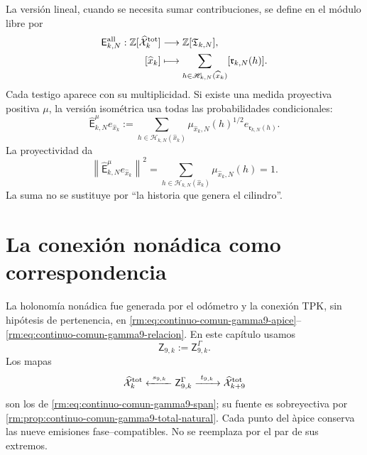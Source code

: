 La versi\'on lineal, cuando se necesita sumar contribuciones, se define en
el m\'odulo libre por
\begin{equation}
\label{rm:eq:pdfv2-terminal-evaluacion-todas}
 \begin{aligned}
 \mathsf E_{k,N}^{\rm all}:
 \mathbb Z[\widehat{\mathcal X}^{\rm tot}_k]&\longrightarrow
 \mathbb Z[\mathfrak T_{k,N}],\\
 [\widehat x_k]&\longmapsto
 \sum_{h\in\mathscr H_{k,N}(\widehat x_k)}
 [\mathfrak r_{k,N}(h)].
 \end{aligned}
\end{equation}
Cada testigo aparece con su multiplicidad. Si existe una medida proyectiva
positiva \(\mu\), la versi\'on isom\'etrica usa todas las probabilidades
condicionales:
\begin{equation}
\label{rm:eq:pdfv2-terminal-evaluacion-ponderada}
 \widehat{\mathsf E}_{k,N}^{\mu}e_{\widehat x_k}
 :=\sum_{h\in\mathscr H_{k,N}(\widehat x_k)}
 \mu_{\widehat x_k,N}(h)^{1/2}
 e_{\mathfrak r_{k,N}(h)}.
\end{equation}
La proyectividad da
\begin{equation}
\label{rm:eq:pdfv2-terminal-isometria}
 \left\|\widehat{\mathsf E}_{k,N}^{\mu}e_{\widehat x_k}\right\|^2
 =\sum_{h\in\mathscr H_{k,N}(\widehat x_k)}
   \mu_{\widehat x_k,N}(h)=1.
\end{equation}
La suma no se sustituye por ``la historia que genera el cilindro''.

\section{La conexi\'on non\'adica como correspondencia}

La holonom\'ia non\'adica fue generada por el od\'ometro y la conexi\'on TPK,
sin hip\'otesis de pertenencia, en
\eqref{rm:eq:continuo-comun-gamma9-apice}--
\eqref{rm:eq:continuo-comun-gamma9-relacion}. En este cap\'itulo usamos
\begin{equation}
\label{rm:eq:pdfv2-terminal-apice-gamma9}
 \mathsf Z_{9,k}:=\mathsf Z^{\Gamma}_{9,k}.
\end{equation}
Los mapas
\begin{equation}
\label{rm:eq:pdfv2-terminal-span-gamma9}
 \widehat{\mathcal X}^{\rm tot}_k
 \xleftarrow{\ s_{9,k}\ }
 \mathsf Z^{\Gamma}_{9,k}
 \xrightarrow{\ t_{9,k}\ }
 \widehat{\mathcal X}^{\rm tot}_{k+9}
\end{equation}
son los de \eqref{rm:eq:continuo-comun-gamma9-span}; su fuente es sobreyectiva
por \cref{rm:prop:continuo-comun-gamma9-total-natural}. Cada punto del \`apice
conserva las nueve emisiones fase--compatibles. No se reemplaza por el par
de sus extremos.

